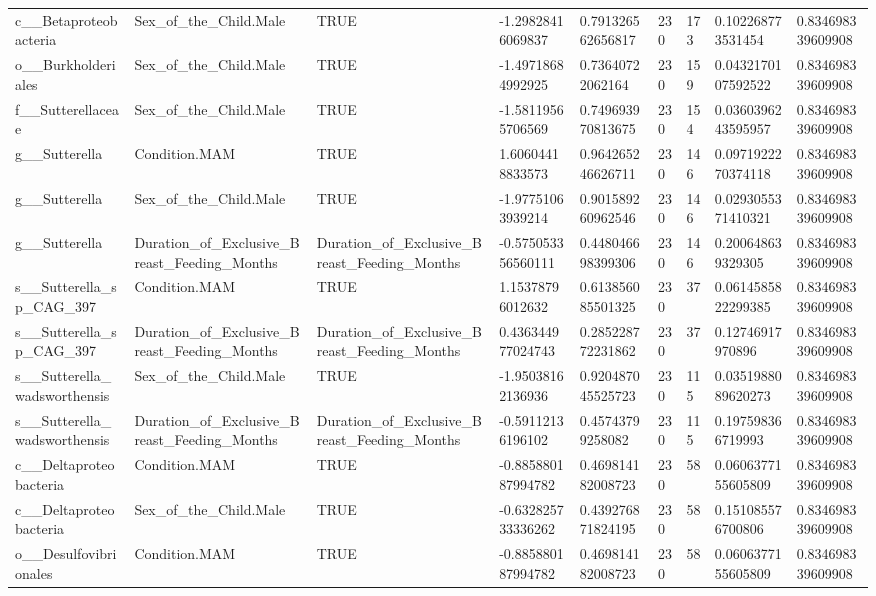 \begin{longtable}{lllllllll}
c\_\_Betaproteobacteria & Sex\_of\_the\_Child.Male & TRUE & -1.29828416069837 & 0.791326562656817 & 230 & 173 & 0.102268773531454 & 0.834698339609908 \\
o\_\_Burkholderiales & Sex\_of\_the\_Child.Male & TRUE & -1.49718684992925 & 0.73640722062164 & 230 & 159 & 0.0432170107592522 & 0.834698339609908 \\
f\_\_Sutterellaceae & Sex\_of\_the\_Child.Male & TRUE & -1.58119565706569 & 0.749693970813675 & 230 & 154 & 0.0360396243595957 & 0.834698339609908 \\
g\_\_Sutterella & Condition.MAM & TRUE & 1.60604418833573 & 0.964265246626711 & 230 & 146 & 0.0971922270374118 & 0.834698339609908 \\
g\_\_Sutterella & Sex\_of\_the\_Child.Male & TRUE & -1.97751063939214 & 0.901589260962546 & 230 & 146 & 0.0293055371410321 & 0.834698339609908 \\
g\_\_Sutterella & Duration\_of\_Exclusive\_Breast\_Feeding\_Months & Duration\_of\_Exclusive\_Breast\_Feeding\_Months & -0.575053356560111 & 0.448046698399306 & 230 & 146 & 0.200648639329305 & 0.834698339609908 \\
s\_\_Sutterella\_sp\_CAG\_397 & Condition.MAM & TRUE & 1.15378796012632 & 0.613856085501325 & 230 & 37 & 0.0614585822299385 & 0.834698339609908 \\
s\_\_Sutterella\_sp\_CAG\_397 & Duration\_of\_Exclusive\_Breast\_Feeding\_Months & Duration\_of\_Exclusive\_Breast\_Feeding\_Months & 0.436344977024743 & 0.285228772231862 & 230 & 37 & 0.12746917970896 & 0.834698339609908 \\
s\_\_Sutterella\_wadsworthensis & Sex\_of\_the\_Child.Male & TRUE & -1.95038162136936 & 0.920487045525723 & 230 & 115 & 0.0351988089620273 & 0.834698339609908 \\
s\_\_Sutterella\_wadsworthensis & Duration\_of\_Exclusive\_Breast\_Feeding\_Months & Duration\_of\_Exclusive\_Breast\_Feeding\_Months & -0.59112136196102 & 0.45743799258082 & 230 & 115 & 0.197598366719993 & 0.834698339609908 \\
c\_\_Deltaproteobacteria & Condition.MAM & TRUE & -0.885880187994782 & 0.469814182008723 & 230 & 58 & 0.0606377155605809 & 0.834698339609908 \\
c\_\_Deltaproteobacteria & Sex\_of\_the\_Child.Male & TRUE & -0.632825733336262 & 0.439276871824195 & 230 & 58 & 0.151085576700806 & 0.834698339609908 \\
o\_\_Desulfovibrionales & Condition.MAM & TRUE & -0.885880187994782 & 0.469814182008723 & 230 & 58 & 0.0606377155605809 & 0.834698339609908 \\

\end{longtable}
